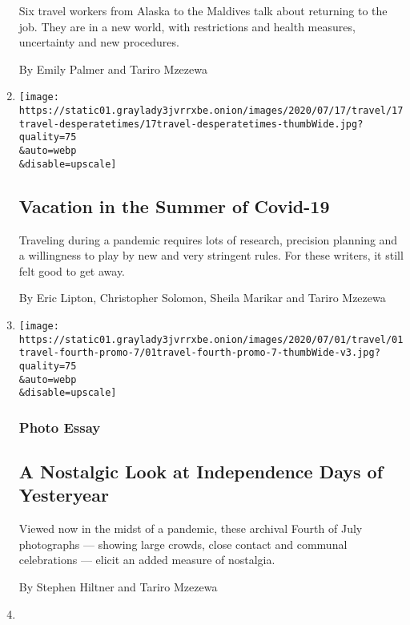 \begin{enumerate}
  Six travel workers from Alaska to the Maldives talk about returning to
  the job. They are in a new world, with restrictions and health
  measures, uncertainty and new procedures.

  By Emily Palmer and Tariro Mzezewa
\item
  \href{/2020/07/16/travel/virus-vacation.html}{}

  \texttt{[image: https://static01.graylady3jvrrxbe.onion/images/2020/07/17/travel/17travel-desperatetimes/17travel-desperatetimes-thumbWide.jpg?quality=75\\\&auto=webp\\\&disable=upscale]}

  \hypertarget{vacation-in-the-summer-of-covid-19}{%
  \subsection{Vacation in the Summer of
  Covid-19}\label{vacation-in-the-summer-of-covid-19}}

  Traveling during a pandemic requires lots of research, precision
  planning and a willingness to play by new and very stringent rules.
  For these writers, it still felt good to get away.

  By Eric Lipton, Christopher Solomon, Sheila Marikar and Tariro Mzezewa
\item
  \href{/2020/07/01/travel/independence-day-archival-photos.html}{}

  \texttt{[image: https://static01.graylady3jvrrxbe.onion/images/2020/07/01/travel/01travel-fourth-promo-7/01travel-fourth-promo-7-thumbWide-v3.jpg?quality=75\\\&auto=webp\\\&disable=upscale]}

  \hypertarget{photo-essay}{%
  \subsubsection{Photo Essay}\label{photo-essay}}

  \hypertarget{a-nostalgic-look-at-independence-days-of-yesteryear}{%
  \subsection{A Nostalgic Look at Independence Days of
  Yesteryear}\label{a-nostalgic-look-at-independence-days-of-yesteryear}}

  Viewed now in the midst of a pandemic, these archival Fourth of July
  photographs --- showing large crowds, close contact and communal
  celebrations --- elicit an added measure of nostalgia.

  By Stephen Hiltner and Tariro Mzezewa
\item
  \href{/2020/06/25/travel/road-tripping-while-black-readers-respond.html}{}


\end{enumerate}
